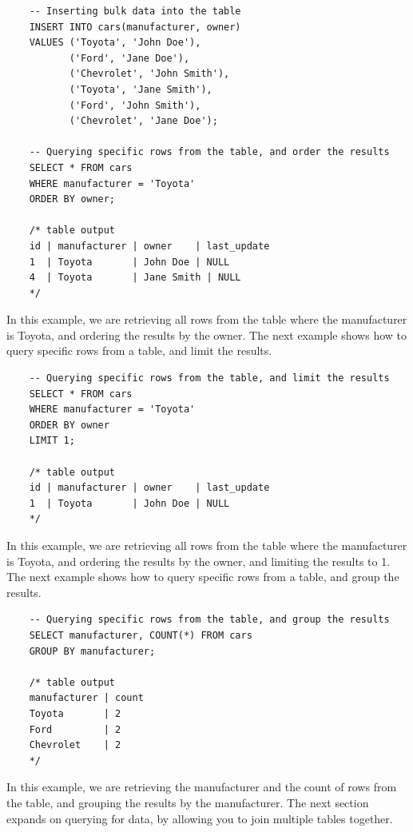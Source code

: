 \begin{verbatim}
    -- Inserting bulk data into the table
    INSERT INTO cars(manufacturer, owner)
    VALUES ('Toyota', 'John Doe'),
           ('Ford', 'Jane Doe'),
           ('Chevrolet', 'John Smith'),
           ('Toyota', 'Jane Smith'),
           ('Ford', 'John Smith'),
           ('Chevrolet', 'Jane Doe');

    -- Querying specific rows from the table, and order the results
    SELECT * FROM cars
    WHERE manufacturer = 'Toyota'
    ORDER BY owner;

    /* table output
    id | manufacturer | owner    | last_update
    1  | Toyota       | John Doe | NULL
    4  | Toyota       | Jane Smith | NULL
    */
\end{verbatim}

In this example, we are retrieving all rows from the table where the manufacturer is Toyota, and ordering the results by the owner. The next example shows how to query specific rows from a table, and limit the results.

\begin{verbatim}
    -- Querying specific rows from the table, and limit the results
    SELECT * FROM cars
    WHERE manufacturer = 'Toyota'
    ORDER BY owner
    LIMIT 1;

    /* table output
    id | manufacturer | owner    | last_update
    1  | Toyota       | John Doe | NULL
    */
\end{verbatim}

In this example, we are retrieving all rows from the table where the manufacturer is Toyota, and ordering the results by the owner, and limiting the results to 1. The next example shows how to query specific rows from a table, and group the results.

\begin{verbatim}
    -- Querying specific rows from the table, and group the results
    SELECT manufacturer, COUNT(*) FROM cars
    GROUP BY manufacturer;

    /* table output
    manufacturer | count
    Toyota       | 2
    Ford         | 2
    Chevrolet    | 2
    */
\end{verbatim}

In this example, we are retrieving the manufacturer and the count of rows from the table, and grouping the results by the manufacturer. The next section expands on querying for data, by allowing you to join multiple tables together.

